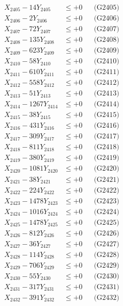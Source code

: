 \documentclass[a4paper,10pt]{article}
\begin{document}
{\begin{align}
X_{2405} - 14Y_{2405} &\leq +0 && \text{(G2405)} \\
X_{2406} - 2Y_{2406} &\leq +0 && \text{(G2406)} \\
X_{2407} - 72Y_{2407} &\leq +0 && \text{(G2407)} \\
X_{2408} - 135Y_{2408} &\leq +0 && \text{(G2408)} \\
X_{2409} - 623Y_{2409} &\leq +0 && \text{(G2409)} \\
X_{2410} - 58Y_{2410} &\leq +0 && \text{(G2410)} \\
\allowbreak
X_{2411} - 610Y_{2411} &\leq +0 && \text{(G2411)} \\
X_{2412} - 558Y_{2412} &\leq +0 && \text{(G2412)} \\
X_{2413} - 51Y_{2413} &\leq +0 && \text{(G2413)} \\
X_{2414} - 1267Y_{2414} &\leq +0 && \text{(G2414)} \\
X_{2415} - 38Y_{2415} &\leq +0 && \text{(G2415)} \\
X_{2416} - 431Y_{2416} &\leq +0 && \text{(G2416)} \\
X_{2417} - 309Y_{2417} &\leq +0 && \text{(G2417)} \\
X_{2418} - 811Y_{2418} &\leq +0 && \text{(G2418)} \\
X_{2419} - 380Y_{2419} &\leq +0 && \text{(G2419)} \\
X_{2420} - 1081Y_{2420} &\leq +0 && \text{(G2420)} \\
\allowbreak
X_{2421} - 38Y_{2421} &\leq +0 && \text{(G2421)} \\
X_{2422} - 224Y_{2422} &\leq +0 && \text{(G2422)} \\
X_{2423} - 1478Y_{2423} &\leq +0 && \text{(G2423)} \\
X_{2424} - 1016Y_{2424} &\leq +0 && \text{(G2424)} \\
X_{2425} - 1478Y_{2425} &\leq +0 && \text{(G2425)} \\
X_{2426} - 812Y_{2426} &\leq +0 && \text{(G2426)} \\
X_{2427} - 36Y_{2427} &\leq +0 && \text{(G2427)} \\
X_{2428} - 114Y_{2428} &\leq +0 && \text{(G2428)} \\
X_{2429} - 706Y_{2429} &\leq +0 && \text{(G2429)} \\
X_{2430} - 55Y_{2430} &\leq +0 && \text{(G2430)} \\
\allowbreak
X_{2431} - 317Y_{2431} &\leq +0 && \text{(G2431)} \\
X_{2432} - 391Y_{2432} &\leq +0 && \text{(G2432)} \\

\end{align}}
\end{document}

